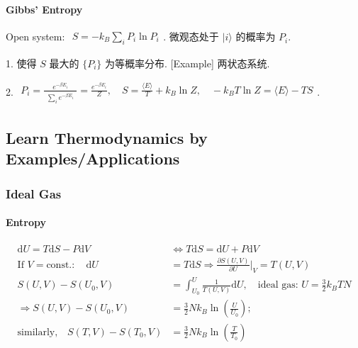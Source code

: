 \documentclass[../../main.tex]{subfiles}
\begin{document}
\paragraph{Gibbs' Entropy} 
Open system: $\begin{aligned}
        S = -k_{B}\sum_{i}P_{i}\ln{P_{i}}
    \end{aligned}$. 微观态处于 $|i\rangle$ 的概率为 $P_{i}$. 

        1. 使得 $S$ 最大的 $\{P_{i}\}$ 为等概率分布. [Example] 两状态系统.
        
        2. $\begin{aligned}
            P_{i} = \frac{e^{-\beta E_{i}}}{\begin{aligned}
                \sum_{i}e^{-\beta E_{i}}
            \end{aligned}} = \frac{e^{-\beta E_{i}}}{Z}
        ,\quad
            S = \frac{\langle E\rangle}{T} + k_{B}\ln{Z}
        ,\quad
            -k_{B}T\ln{Z} = \langle E\rangle - TS
        \end{aligned}$. 

\subsection{Learn Thermodynamics by Examples/Applications}

\subsubsection{Ideal Gas}
\paragraph{Entropy}
\begin{align*}
    \mathrm{d}U =T\mathrm{d}S - P\mathrm{d}V&\Leftrightarrow T\mathrm{d}S = \mathrm{d}U + P\mathrm{d}V\\
    \text{If }V = \text{const.}:\quad \mathrm{d}U &= T\mathrm{d}S\Rightarrow \frac{\partial S(U,V)}{\partial U}\bigg|_{V} = T(U,V)\\
    S(U,V) - S(U_{0},V) &= \int_{U_{0}}^{U}\frac{1}{T(U,V)}\mathrm{d}U,\quad\text{ideal gas: }U = \frac{3}{2}k_{B}TN\\
    \Rightarrow S(U,V) - S(U_{0},V) &= \frac{3}{2}Nk_{B}\ln{\left(\frac{U}{U_{0}}\right)};\\
    \text{similarly,}\quad S(T,V) - S(T_{0},V) &= \frac{3}{2}Nk_{B}\ln{\left(\frac{T}{T_{0}}\right)}
\end{align*}
\end{document}
